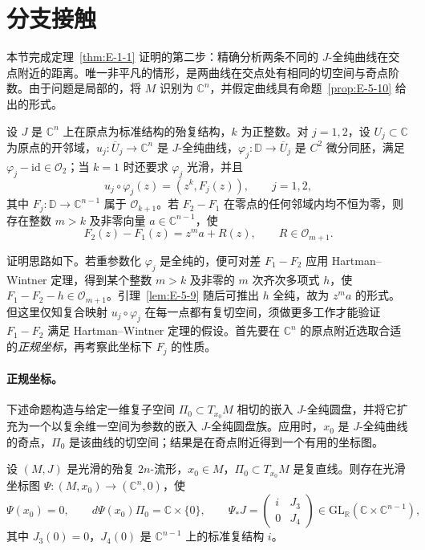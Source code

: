 
\section{分支接触}\label{sec:E-6}

本节完成定理~\ref{thm:E-1-1} 证明的第二步：精确分析两条不同的 $J$-全纯曲线在交点附近的距离。唯一非平凡的情形，是两曲线在交点处有相同的切空间与奇点阶数。由于问题是局部的，将 $M$ 识别为 $\mathbb C^n$，并假定曲线具有命题~\ref{prop:E-5-10} 给出的形式。

\begin{proposition}\label{prop:E-6-1}
设 $J$ 是 $\mathbb C^n$ 上在原点为标准结构的殆复结构，$k$ 为正整数。对 $j=1,2$，设 $U_j\subset\mathbb C$ 为原点的开邻域，$u_j:\overline U_j\to\mathbb C^n$ 是 $J$-全纯曲线，$\varphi_j:\mathbb D\to\overline U_j$ 是 $C^2$ 微分同胚，满足 $\varphi_j-\mathrm{id}\in\mathcal O_2$；当 $k=1$ 时还要求 $\varphi_j$ 光滑，并且
\[
  u_j\circ\varphi_j(z)=(z^k,F_j(z)),\qquad j=1,2,
\]
其中 $F_j:\mathbb D\to\mathbb C^{n-1}$ 属于 $\mathcal O_{k+1}$。若 $F_2-F_1$ 在零点的任何邻域内均不恒为零，则存在整数 $m>k$ 及非零向量 $a\in\mathbb C^{n-1}$，使
\[
  F_2(z)-F_1(z)=z^ma+R(z),\qquad R\in\mathcal O_{m+1}.
\]
\end{proposition}

证明思路如下。若重参数化 $\varphi_j$ 是全纯的，便可对差 $F_1-F_2$ 应用 Hartman--Wintner 定理，得到某个整数 $m>k$ 及非零的 $m$ 次齐次多项式 $h$，使 $F_1-F_2-h\in\mathcal O_{m+1}$。引理~\ref{lem:E-5-9} 随后可推出 $h$ 全纯，故为 $z^ma$ 的形式。但这里仅知复合映射 $u_j\circ\varphi_j$ 在每一点都有复切空间，须做更多工作才能验证 $F_1-F_2$ 满足 Hartman--Wintner 定理的假设。首先要在 $\mathbb C^n$ 的原点附近选取合适的\emph{正规坐标}，再考察此坐标下 $F_j$ 的性质。

\paragraph{正规坐标。}
下述命题构造与给定一维复子空间 $\Pi_0\subset T_{x_0}M$ 相切的嵌入 $J$-全纯圆盘，并将它扩充为一个以复余维一空间为参数的嵌入 $J$-全纯圆盘族。应用时，$x_0$ 是 $J$-全纯曲线的奇点，$\Pi_0$ 是该曲线的切空间；结果是在奇点附近得到一个有用的坐标图。

\begin{proposition}\label{prop:E-6-2}
设 $(M,J)$ 是光滑的殆复 $2n$-流形，$x_0\in M$，$\Pi_0\subset T_{x_0}M$ 是复直线。则存在光滑坐标图 $\Psi:(M,x_0)\to(\mathbb C^n,0)$，使
\[
  \Psi(x_0)=0,\qquad d\Psi(x_0)\Pi_0=\mathbb C\times\{0\},
  \qquad
  \Psi_*J=\begin{pmatrix}i&J_3\\0&J_4\end{pmatrix}
  \in\mathrm{GL}_{\mathbb R}(\mathbb C\times\mathbb C^{n-1}),
\]
其中 $J_3(0)=0$，$J_4(0)$ 是 $\mathbb C^{n-1}$ 上的标准复结构 $i$。
\end{proposition}

